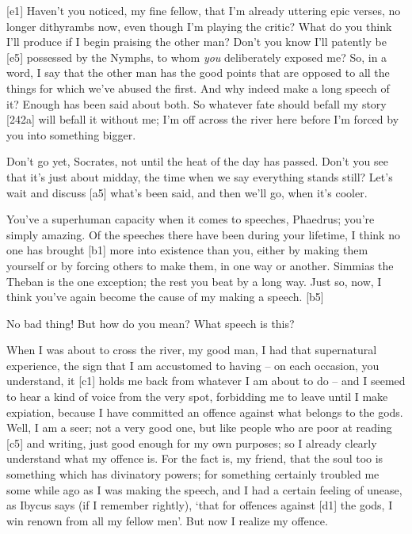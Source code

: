 {[}e1{]}  Haven't you noticed, my fine fellow, that I'm already
uttering epic verses, no longer dithyrambs now, even though I'm playing
the critic? What do you
think I'll produce if I begin praising the other man? Don't you know
I'll patently be {[}e5{]} possessed by the Nymphs, to whom {\em you}
deliberately exposed me? So, in a word, I say that the other man has the
good points that are opposed to all the things for which we've abused
the first. And why indeed make a long speech of it? Enough has been said
about both. So whatever fate should befall my story {[}242a{]} will
befall it without me; I'm
off across the river here before I'm forced by you into something
bigger.

 Don't go yet, Socrates, not until the heat of the day has
passed. Don't you see that it's just about midday, the
time when we say
everything stands still? Let's wait and discuss {[}a5{]} what's been
said, and then we'll go, when it's cooler.

 You've a superhuman
capacity when it comes to
speeches, Phaedrus; you're simply amazing. Of the speeches there have
been during your lifetime, I think no one has brought {[}b1{]} more into
existence than you, either by making them yourself or by forcing others
to make them, in one way or another. Simmias the
Theban is the one
exception; the rest you beat by a long way. Just so, now, I think you've
again become the cause of my making a speech. {[}b5{]}

 No bad thing! But how do you mean? What speech is this?

 When I was about to cross the river, my good man, I had that
supernatural experience, the
sign that I am accustomed
to having -- on each occasion, you understand, it {[}c1{]} holds me back
from whatever I am about to do -- and I seemed to hear a kind of voice
from the very spot, forbidding me to leave until I make expiation,
because I have committed an offence against what belongs to the
gods. Well, I am a seer;
not a very good one, but like people who are poor at reading {[}c5{]}
and writing, just good enough for my own purposes; so I already clearly
understand what my offence is. For the fact is, my friend, that the soul
too is something which has divinatory powers; for something certainly
troubled me some while ago as I was making the speech, and I had a
certain feeling of unease, as Ibycus says (if I remember rightly), ‘that
for offences against {[}d1{]} the gods, I win renown from all my fellow
men'. But now I realize
my offence.


